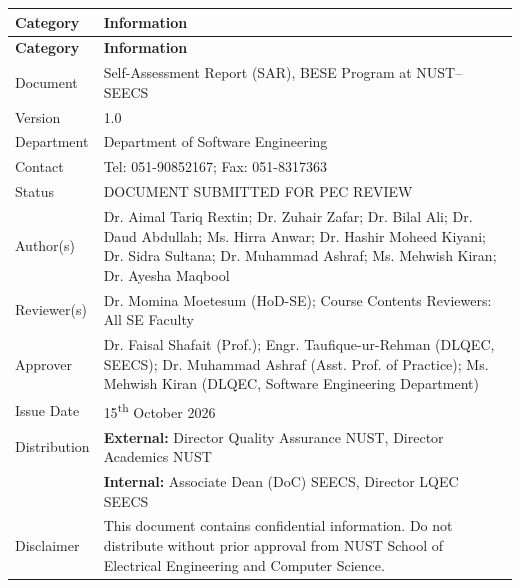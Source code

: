 \documentclass[12pt, a4paper]{report}
\renewcommand{\arraystretch}{1.25}
\begin{document}
\begingroup
\footnotesize
\setlength{\tabcolsep}{6pt}
\renewcommand{\arraystretch}{1.18}
\begin{longtable}{@{}p{}p{}@{}}
\toprule
\textbf{Category} & \textbf{Information}\\
\midrule
\endfirsthead
\toprule
\textbf{Category} & \textbf{Information}\\
\midrule
\endhead
\bottomrule
\endfoot
Document & Self-Assessment Report (SAR), BESE Program at NUST--SEECS\\
Version & 1.0\\
Department & Department of Software Engineering\\
Contact & Tel: 051-90852167; Fax: 051-8317363\\
Status & DOCUMENT SUBMITTED FOR PEC REVIEW\\
Author(s) &  Dr. Aimal Tariq Rextin; Dr. Zuhair Zafar; Dr. Bilal Ali; Dr. Daud Abdullah; Ms. Hirra Anwar; Dr. Hashir Moheed Kiyani;  Dr. Sidra Sultana; Dr. Muhammad Ashraf; Ms. Mehwish Kiran; Dr. Ayesha Maqbool\\
Reviewer(s) & Dr. Momina Moetesum (HoD-SE);  Course Contents Reviewers: All SE Faculty\\
Approver & Dr. Faisal Shafait (Prof.); Engr. Taufique-ur-Rehman (DLQEC, SEECS); Dr. Muhammad Ashraf (Asst. Prof. of Practice); Ms. Mehwish Kiran (DLQEC, Software Engineering Department)\\
Issue Date & 15\textsuperscript{th} October 2026\\
Distribution & \textbf{External:} Director Quality Assurance NUST, Director Academics NUST\\
 & \textbf{Internal:} Associate Dean (DoC) SEECS, Director LQEC SEECS\\
Disclaimer & This document contains confidential information. Do not distribute without prior approval from NUST School of Electrical Engineering and Computer Science.\\
\end{longtable}
\endgroup

\hypersetup{pageanchor=true}
\tableofcontents
\clearpage
{}

\graphicspath{{images/front_matter/media/}}

\clearpage
\end{document}
